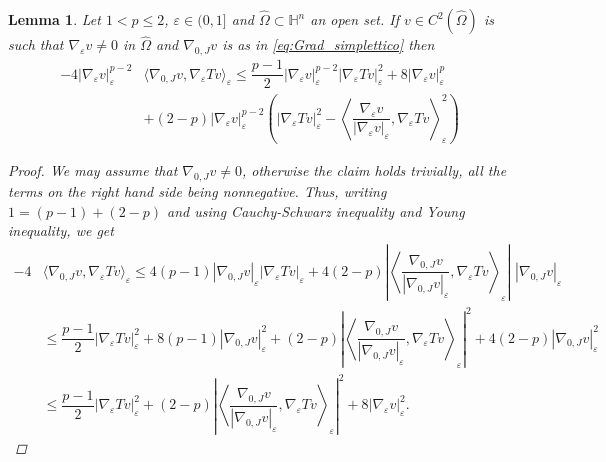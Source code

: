 \documentclass[10pt]{amsart}
\numberwithin{equation}{section}
\newtheorem{lemma}[theorem]{Lemma}
\theoremstyle{definition}
\newcommand{\He}{\mathbb{H}}
\begin{document}
\begin{lemma}\label{lem:Stima_4_Grad_simplettico}
	Let $1<p\leq 2$, $\varepsilon \in(0,1]$ and $\widehat{\Omega} \subset \He^n$ an open set. If $v\in C^2(\widehat{\Omega})$ is such that $\nabla_\varepsilon v \neq 0$ in $\widehat{\Omega}$ and $\nabla_{0,J}v$ is as in \eqref{eq:Grad_simplettico} then   
	\begin{equation}\label{eq:Stima_4_Grad_simplettico}
		\begin{aligned}
			-4 |\nabla_{\varepsilon}v|_{\varepsilon}^{p-2} & \langle \nabla_{0,J}v, \nabla_{\varepsilon}T v \rangle_{\varepsilon} \leq \dfrac{p-1}{2}|\nabla_{\varepsilon}v|_{\varepsilon}^{p-2} |\nabla_{\varepsilon}T v|_{\varepsilon}^{2} + 8 |\nabla_{\varepsilon}v|_{\varepsilon}^{p}\\
			&+ (2-p) |\nabla_{\varepsilon}v|_{\varepsilon}^{p-2} \left(|\nabla_{\varepsilon}T v|_{\varepsilon}^{2} - \left\langle\dfrac{\nabla_{\varepsilon}v}{|\nabla_{\varepsilon}v|_{\varepsilon}}, \nabla_{\varepsilon}T v\right\rangle_{\varepsilon}^2\right)
		\end{aligned}
	\end{equation}
	\begin{proof}
	We may assume that $\nabla_{0,J}v \neq 0$, otherwise the claim holds trivially, all the terms on the right hand side being nonnegative. Thus, writing $1=(p-1)+(2-p)$ and using Cauchy-Schwarz inequality and Young inequality, we get
		\begin{equation}\label{eq:Prima_stima_grad_simplettico}
			\begin{aligned}
				-4 &\langle \nabla_{0,J}v, \nabla_{\varepsilon}T v \rangle_{\varepsilon}  \leq 4 (p-1) |\nabla_{0,J}v|_{\varepsilon} |\nabla_{\varepsilon}T v|_{\varepsilon} + 4(2-p) \left|\left\langle \dfrac{\nabla_{0,J}v}{|\nabla_{0,J}v|_{\varepsilon}}, \nabla_{\varepsilon}T v \right\rangle_{\varepsilon}\right|\,\,|\nabla_{0,J}v|_{\varepsilon}\\
				&\leq \dfrac{p-1}{2}|\nabla_{\varepsilon}T v|_{\varepsilon}^2 + 8(p-1)|\nabla_{0,J}v|_{\varepsilon}^2  + (2-p)\left|\left\langle \dfrac{\nabla_{0,J}v}{|\nabla_{0,J}v|_{\varepsilon}}, \nabla_{\varepsilon}T v \right\rangle_{\varepsilon}\right|^2 + 4(2-p)|\nabla_{0,J}v|_{\varepsilon}^2 \\
				&\leq \dfrac{p-1}{2}|\nabla_{\varepsilon}T v|_{\varepsilon}^2 + (2-p)\left|\left\langle \dfrac{\nabla_{0,J}v}{|\nabla_{0,J}v|_{\varepsilon}}, \nabla_{\varepsilon}T v \right\rangle_{\varepsilon}\right|^2 + 8|\nabla_{\varepsilon}v|_{\varepsilon}^2.

\end{aligned}
\end{equation}
\end{proof}
\end{lemma}
\end{document}
